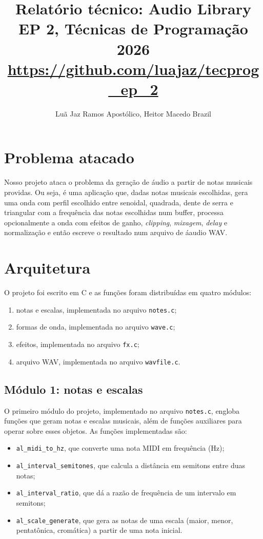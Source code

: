 \documentclass{article}
\title{\textbf{Relatório técnico: Audio Library} \\[1em] EP 2, Técnicas de Programação 2026
\\[1em] \url{https://github.com/luajaz/tecprog_ep_2}}
\author{Luã Jaz Ramos Apostólico, Heitor Macedo Brazil}
\begin{document}
\maketitle

\tableofcontents

\clearpage

\section{Problema atacado}
Nosso projeto ataca o problema da geração de áudio a partir de notas musicais providas. Ou seja, é uma aplicação que, dadas notas musicais escolhidas, gera uma onda com perfil escolhido entre senoidal, quadrada, dente de serra e triangular com a frequência das notas escolhidas num buffer, processa opcionalmente a onda com efeitos de ganho, \textit{clipping}, \textit{mixagem}, \textit{delay} e normalização e então escreve o resultado num arquivo de áaudio WAV.

\section{Arquitetura}

O projeto foi escrito em C e as funções foram distribuídas em quatro módulos:
\begin{enumerate}
    \item notas e escalas, implementada no arquivo \texttt{notes.c};
    \item formas de onda, implementada no arquivo \texttt{wave.c};
    \item efeitos, implementada no arquivo \texttt{fx.c};
    \item arquivo WAV, implementada no arquivo \texttt{wavfile.c}.
\end{enumerate}

\subsection{Módulo 1: notas e escalas}
O primeiro módulo do projeto, implementado no arquivo \texttt{notes.c}, engloba funções que geram notas e escalas musicais, além de funções auxiliares para operar sobre esses objetos. As funções implementadas são:
\begin{itemize}
    \item \texttt{al\_midi\_to\_hz}, que converte uma nota MIDI em frequência (Hz);
    \item \texttt{al\_interval\_semitones}, que calcula a distância em semitons entre duas notas;
    \item \texttt{al\_interval\_ratio}, que dá a razão de frequência de um intervalo em semitons;
    \item \texttt{al\_scale\_generate}, que gera as notas de uma escala (maior, menor, pentatônica, cromática) a partir de uma nota inicial.
\end{itemize}
\end{document}
